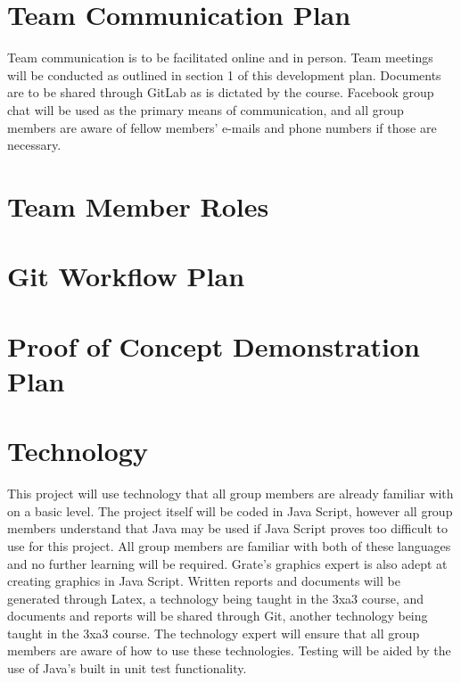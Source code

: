 \documentclass{article}
\begin{document}

\section{Team Communication Plan}

Team communication is to be facilitated online and in person. Team meetings will 
be conducted as outlined in section 1 of this development plan. Documents are to 
be shared through GitLab as is dictated by the course. Facebook group chat will 
be used as the primary means of communication, and all group members are aware 
of fellow members’ e-mails and phone numbers if those are necessary.

\section{Team Member Roles}

\section{Git Workflow Plan}

\section{Proof of Concept Demonstration Plan}

\section{Technology}

This project will use technology that all group members are already familiar 
with on a basic level. The project itself will be coded in Java Script, however 
all group members understand that Java may be used if Java Script proves too 
difficult to use for this project. All group members are familiar with both of 
these languages and no further learning will be required. Grate’s graphics 
expert is also adept at creating graphics in Java Script. Written reports and 
documents will be generated through Latex, a technology being taught in the 3xa3 
course, and documents and reports will be shared through Git, another technology 
being taught in the 3xa3 course. The technology expert will ensure that all 
group members are aware of how to use these technologies. Testing will be aided 
by the use of Java’s built in unit test functionality.
\end{document}
